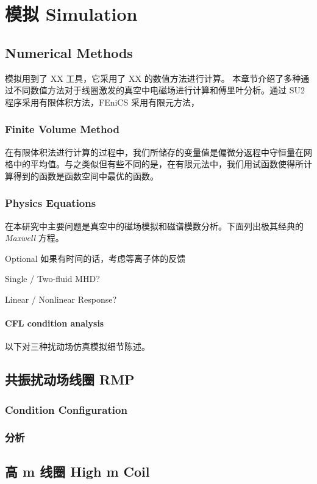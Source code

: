 \chapter{模拟 Simulation}

\section{Numerical Methods}
模拟用到了 XX 工具，它采用了 XX 的数值方法进行计算。
本章节介绍了多种通过不同数值方法对于线圈激发的真空中电磁场进行计算和傅里叶分析。通过 SU2 程序采用有限体积方法，FEniCS 采用有限元方法，

\subsection{Finite Volume Method}
在有限体积法进行计算的过程中，我们所储存的变量值是偏微分返程中守恒量在网格中的平均值。与之类似但有些不同的是，在有限元法中，我们用试函数使得所计算得到的函数是函数空间中最优的函数。

\subsection{Physics Equations}
在本研究中主要问题是真空中的磁场模拟和磁谱模数分析。下面列出极其经典的 \textit{Maxwell} 方程。




Optional 如果有时间的话，考虑等离子体的反馈

Single / Two-fluid MHD?

Linear / Nonlinear Response?

\subsubsection{CFL condition analysis}


以下对三种扰动场仿真模拟细节陈述。
\section{共振扰动场线圈 RMP}
\subsection{Condition Configuration}
\subsection{分析}
\section{高 m 线圈 High m Coil}
